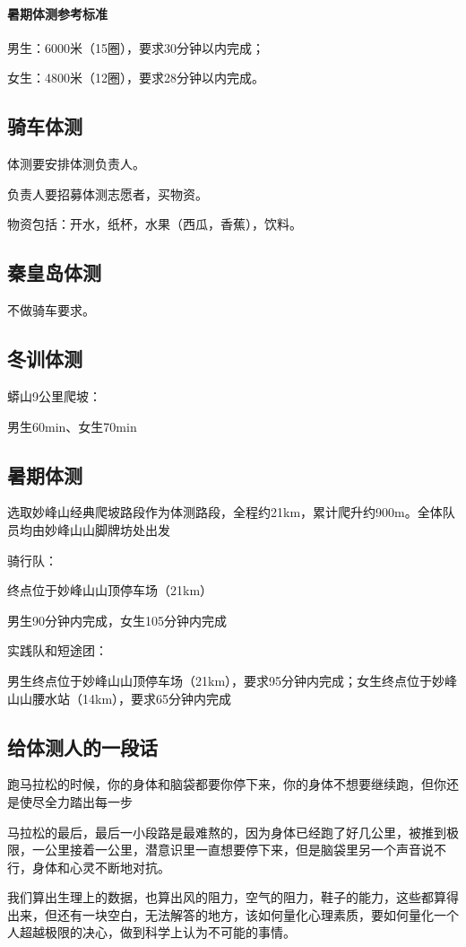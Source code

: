 \documentclass{ctexbook}
\begin{document}
\paragraph{暑期体测参考标准}
男生：6000米（15圈），要求30分钟以内完成；

女生：4800米（12圈），要求28分钟以内完成。


\subsection{骑车体测}

体测要安排体测负责人。

负责人要招募体测志愿者，买物资。

物资包括：开水，纸杯，水果（西瓜，香蕉），饮料。

\subsection{秦皇岛体测}
不做骑车要求。
\subsection{冬训体测}
蟒山9公里爬坡：

男生60min、女生70min
\subsection{暑期体测}
选取妙峰山经典爬坡路段作为体测路段，全程约21km，累计爬升约900m。全体队员均由妙峰山山脚牌坊处出发

骑行队：

终点位于妙峰山山顶停车场（21km）

男生90分钟内完成，女生105分钟内完成

实践队和短途团：

男生终点位于妙峰山山顶停车场（21km），要求95分钟内完成；女生终点位于妙峰山山腰水站（14km），要求65分钟内完成
\subsection{给体测人的一段话}
跑马拉松的时候，你的身体和脑袋都要你停下来，你的身体不想要继续跑，但你还是使尽全力踏出每一步

马拉松的最后，最后一小段路是最难熬的，因为身体已经跑了好几公里，被推到极限，一公里接着一公里，潜意识里一直想要停下来，但是脑袋里另一个声音说不行，身体和心灵不断地对抗。

我们算出生理上的数据，也算出风的阻力，空气的阻力，鞋子的能力，这些都算得出来，但还有一块空白，无法解答的地方，该如何量化心理素质，要如何量化一个人超越极限的决心，做到科学上认为不可能的事情。
\end{document}
